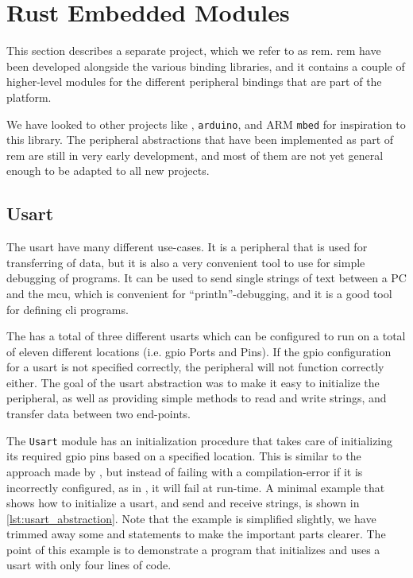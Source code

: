 
\section{Rust Embedded Modules}
\label{sec:rust-embedded-modules}

This section describes a separate project, which we refer to as \gls{rem}.
\gls{rem} have been developed alongside the various binding libraries, and it contains a couple of higher-level modules for the different peripheral bindings that are part of the {\rg} platform.

We have looked to other projects like {\zinc}, \texttt{arduino}, and ARM \texttt{mbed} for inspiration to this library.
The peripheral abstractions that have been implemented as part of \gls{rem} are still in very early development, and most of them are not yet general enough to be adapted to all new projects.

\subsection{Usart}
\label{ssub:usart}

The \gls{usart} have many different use-cases.
It is a peripheral that is used for transferring of data, but it is also a very convenient tool to use for simple debugging of programs.
It can be used to send single strings of text between a PC and the \gls{mcu}, which is convenient for ``println''-debugging, and it is a good tool for defining \gls{cli} programs.

The {\gecko} has a total of three different \glspl{usart} which can be configured to run on a total of eleven different locations (i.e. \gls{gpio} Ports and Pins).
If the \gls{gpio} configuration for a \gls{usart}  is not specified correctly, the peripheral will not function correctly either.
The goal of the \gls{usart} abstraction was to make it easy to initialize the peripheral, as well as providing simple methods to read and write strings, and transfer data between two end-points.

The \texttt{Usart} module has an initialization procedure that takes care of initializing its required \gls{gpio} pins based on a specified location.
This is similar to the approach made by {\zinc}, but instead of failing with a compilation-error if it is incorrectly configured, as in {\zinc}, it will fail at run-time.
A minimal example that shows how to initialize a \gls{usart}, and send and receive strings, is shown in \autoref{lst:usart_abstraction}.
Note that the example is simplified slightly, we have trimmed away some  and  statements to make the important parts clearer.
The point of this example is to demonstrate a program that initializes and uses a \gls{usart} with only four lines of code.


